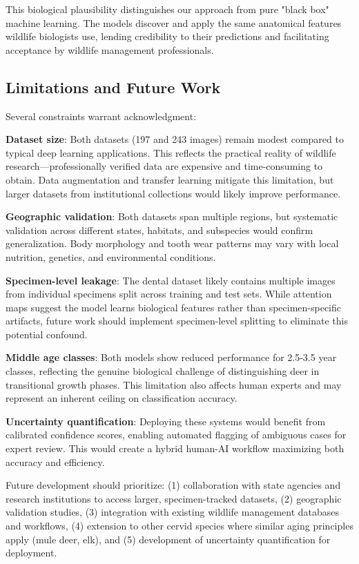 \documentclass{iopjournal}
\begin{document}
This biological plausibility distinguishes our approach from pure "black box" machine learning. The models discover and apply the same anatomical features wildlife biologists use, lending credibility to their predictions and facilitating acceptance by wildlife management professionals.

\subsection{Limitations and Future Work}

Several constraints warrant acknowledgment:

\textbf{Dataset size}: Both datasets (197 and 243 images) remain modest compared to typical deep learning applications. This reflects the practical reality of wildlife research—professionally verified data are expensive and time-consuming to obtain. Data augmentation and transfer learning mitigate this limitation, but larger datasets from institutional collections would likely improve performance.

\textbf{Geographic validation}: Both datasets span multiple regions, but systematic validation across different states, habitats, and subspecies would confirm generalization. Body morphology and tooth wear patterns may vary with local nutrition, genetics, and environmental conditions.

\textbf{Specimen-level leakage}: The dental dataset likely contains multiple images from individual specimens split across training and test sets. While attention maps suggest the model learns biological features rather than specimen-specific artifacts, future work should implement specimen-level splitting to eliminate this potential confound.

\textbf{Middle age classes}: Both models show reduced performance for 2.5-3.5 year classes, reflecting the genuine biological challenge of distinguishing deer in transitional growth phases. This limitation also affects human experts and may represent an inherent ceiling on classification accuracy.

\textbf{Uncertainty quantification}: Deploying these systems would benefit from calibrated confidence scores, enabling automated flagging of ambiguous cases for expert review. This would create a hybrid human-AI workflow maximizing both accuracy and efficiency.

Future development should prioritize: (1) collaboration with state agencies and research institutions to access larger, specimen-tracked datasets, (2) geographic validation studies, (3) integration with existing wildlife management databases and workflows, (4) extension to other cervid species where similar aging principles apply (mule deer, elk), and (5) development of uncertainty quantification for deployment.
\end{document}
